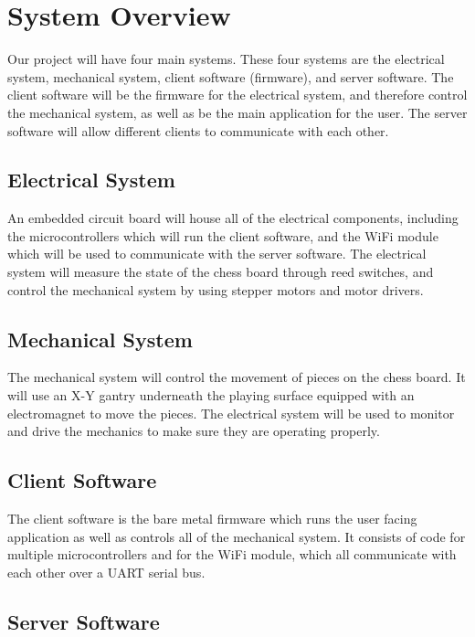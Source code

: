 \documentclass{article}
\begin{document}
\section*{System Overview}
\indent

Our project will have four main systems. These four systems are the electrical system, mechanical system, client software (firmware), and server software. The client software will be the firmware for the electrical system, and therefore control the mechanical system, as well as be the main application for the user. The server software will allow different clients to communicate with each other.

\subsection*{Electrical System}
\indent

An embedded circuit board will house all of the electrical components, including the microcontrollers which will run the client software, and the WiFi module which will be used to communicate with the server software. The electrical system will measure the state of the chess board through reed switches, and control the mechanical system by using stepper motors and motor drivers.

\subsection*{Mechanical System}
\indent

The mechanical system will control the movement of pieces on the chess board. It will use an X-Y gantry underneath the playing surface equipped with an electromagnet to move the pieces. The electrical system will be used to monitor and drive the mechanics to make sure they are operating properly.

\subsection*{Client Software}
\indent

The client software is the bare metal firmware which runs the user facing application as well as controls all of the mechanical system. It consists of code for multiple microcontrollers and for the WiFi module, which all communicate with each other over a UART serial bus.

\subsection*{Server Software}
\indent
\end{document}
